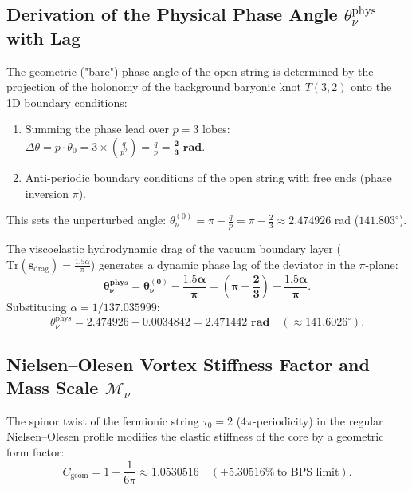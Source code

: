 \documentclass[12pt,a4paper]{article}
\begin{document}
	\subsection{Derivation of the Physical Phase Angle $\theta_\nu^{\text{phys}}$ with Lag}
	The geometric ("bare") phase angle of the open string is determined by the projection of the holonomy of the background baryonic knot $T(3,2)$ onto the 1D boundary conditions:
	\begin{enumerate}
	\item Summing the phase lead over $p=3$ lobes: $\Delta \theta = p \cdot \theta_0 = 3 \times \left(\frac{q}{p^2}\right) = \frac{q}{p} = \mathbf{\frac{2}{3} \text{ rad}}$.
	\item Anti-periodic boundary conditions of the open string with free ends (phase inversion $\pi$).
	\end{enumerate}
	This sets the unperturbed angle: $\theta_\nu^{(0)} = \pi - \frac{q}{p} = \pi - \frac{2}{3} \approx 2.474926$ rad ($141.803^\circ$).
				
	The viscoelastic hydrodynamic drag of the vacuum boundary layer ($\mathrm{Tr}(\mathbf{s}_{\text{drag}}) = \frac{1.5\alpha}{\pi}$) generates a dynamic phase lag of the deviator in the $\pi$-plane:
	\begin{equation}
	\mathbf{\theta_\nu^{\text{phys}} = \theta_\nu^{(0)} - \frac{1.5\alpha}{\pi} = \left(\pi - \frac{2}{3}\right) - \frac{1.5\alpha}{\pi}}.
	\end{equation}
	Substituting $\alpha = 1/137.035999$:
	\begin{equation}
	\theta_\nu^{\text{phys}} = 2.474926 - 0.0034842 = \mathbf{2.471442 \text{ rad}} \quad (\approx 141.6026^\circ).
	\end{equation}
				
	\subsection{Nielsen--Olesen Vortex Stiffness Factor and Mass Scale $\mathcal{M}_\nu$}
	The spinor twist of the fermionic string $\tau_0 = 2$ ($4\pi$-periodicity) in the regular Nielsen--Olesen profile modifies the elastic stiffness of the core by a geometric form factor:
	\begin{equation}
	C_{\text{geom}} = 1 + \frac{1}{6\pi} \approx 1.0530516 \quad (\mathbf{+5.30516\%} \ \text{to BPS limit}).
	\end{equation}
				
\end{document}

